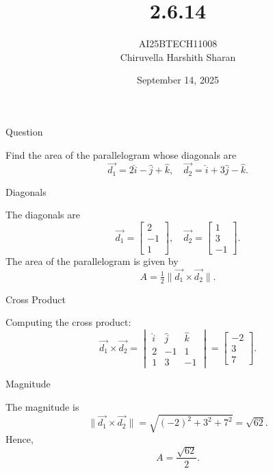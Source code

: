 \documentclass{beamer}
\title
{2.6.14}
\date{September 14, 2025}
\author 
{AI25BTECH11008\\Chiruvella Harshith Sharan}
\begin{document}
\frame{\titlepage}

\begin{frame}{Question}
\begin{center}
Find the area of the parallelogram whose diagonals are
\[
\vec{d_1} = 2\hat{i} - \hat{j} + \hat{k}, \quad
\vec{d_2} = \hat{i} + 3\hat{j} - \hat{k}.
\]
\end{center}
\end{frame}

\begin{frame}{Diagonals}
\begin{center}
The diagonals are
\[
\vec{d_1} = \begin{bmatrix}2 \\ -1 \\ 1\end{bmatrix}, \quad
\vec{d_2} = \begin{bmatrix}1 \\ 3 \\ -1\end{bmatrix}.
\]
The area of the parallelogram is given by
\begin{equation}
A = \tfrac{1}{2}\|\vec{d_1} \times \vec{d_2}\|.
\end{equation}
\end{center}
\end{frame}

\begin{frame}{Cross Product}
\begin{center}
Computing the cross product:
\begin{equation}
\vec{d_1} \times \vec{d_2} =
\begin{vmatrix}
\hat{i} & \hat{j} & \hat{k} \\
2 & -1 & 1 \\
1 & 3 & -1
\end{vmatrix}
= \begin{bmatrix}-2 \\ 3 \\ 7\end{bmatrix}.
\end{equation}
\end{center}
\end{frame}

\begin{frame}{Magnitude}
\begin{center}
The magnitude is
\begin{equation}
\|\vec{d_1} \times \vec{d_2}\| = \sqrt{(-2)^2 + 3^2 + 7^2}
= \sqrt{62}.
\end{equation}
Hence,
\begin{equation}
A = \frac{\sqrt{62}}{2}.
\end{equation}
\end{center}
\end{frame}
\end{document}
